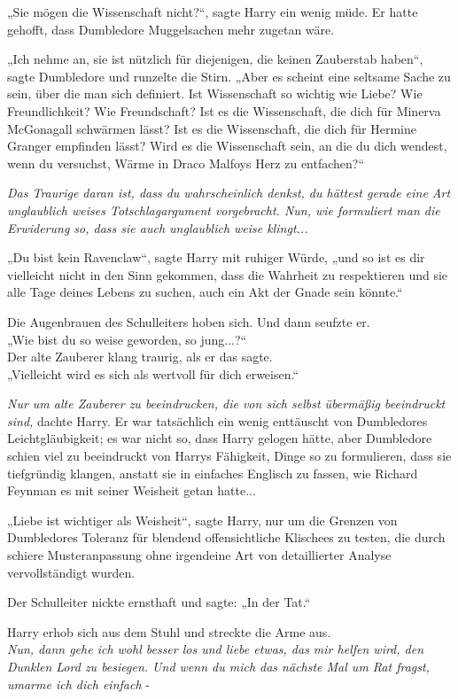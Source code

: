 {„Sie mögen die Wissenschaft nicht?“, sagte Harry ein wenig müde. Er hatte gehofft, dass Dumbledore Muggelsachen mehr zugetan wäre.

„Ich nehme an, sie ist nützlich für diejenigen, die keinen Zauberstab haben“, sagte Dumbledore und runzelte die Stirn. „Aber es scheint eine seltsame Sache zu sein, über die man sich definiert. Ist Wissenschaft so wichtig wie Liebe? Wie Freundlichkeit? Wie Freundschaft? Ist es die Wissenschaft, die dich für Minerva McGonagall schwärmen lässt? Ist es die Wissenschaft, die dich für Hermine Granger empfinden lässt? Wird es die Wissenschaft sein, an die du dich wendest, wenn du versuchst, Wärme in Draco Malfoys Herz zu entfachen?“

\emph{Das Traurige daran ist, dass du wahrscheinlich denkst, du hättest gerade eine Art unglaublich weises Totschlagargument vorgebracht. Nun, wie formuliert man die Erwiderung so, dass sie auch unglaublich weise klingt...}

„Du bist kein Ravenclaw“, sagte Harry mit ruhiger Würde, „und so ist es dir vielleicht nicht in den Sinn gekommen, dass die Wahrheit zu respektieren und sie alle Tage deines Lebens zu suchen, auch ein Akt der Gnade sein könnte.“

Die Augenbrauen des Schulleiters hoben sich. Und dann seufzte er.\\ „Wie bist du so weise geworden, so jung...?“\\ Der alte Zauberer klang traurig, als er das sagte.\\ „Vielleicht wird es sich als wertvoll für dich erweisen.“

\emph{Nur um alte Zauberer zu beeindrucken, die von sich selbst übermäßig beeindruckt sind,} dachte Harry. Er war tatsächlich ein wenig enttäuscht von Dumbledores Leichtgläubigkeit; es war nicht so, dass Harry gelogen hätte, aber Dumbledore schien viel zu beeindruckt von Harrys Fähigkeit, Dinge so zu formulieren, dass sie tiefgründig klangen, anstatt sie in einfaches Englisch zu fassen, wie Richard Feynman es mit seiner Weisheit getan hatte...

„Liebe ist wichtiger als Weisheit“, sagte Harry, nur um die Grenzen von Dumbledores Toleranz für blendend offensichtliche Klischees zu testen, die durch schiere Musteranpassung ohne irgendeine Art von detaillierter Analyse vervollständigt wurden.

Der Schulleiter nickte ernsthaft und sagte: „In der Tat.“

Harry erhob sich aus dem Stuhl und streckte die Arme aus.\\ \emph{Nun, dann gehe ich wohl besser los und liebe etwas, das mir helfen wird, den Dunklen Lord zu besiegen. Und wenn du mich das nächste Mal um Rat fragst, umarme ich dich einfach} -

}
